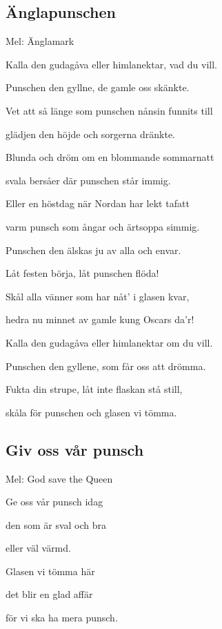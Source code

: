 

\pagestyle{Punschvisor}



\subsection{\textbf{Änglapunschen}}

Mel: Änglamark\bigskip


Kalla den gudagåva eller himlanektar, vad du vill.

Punschen den gyllne, de gamle oss skänkte.

Vet att så länge som punschen nånsin funnits till

glädjen den höjde och sorgerna dränkte.

Blunda och dröm om en blommande sommarnatt

svala bersåer där punschen står immig.

Eller en höstdag när Nordan har lekt tafatt

varm punsch som ångar och ärtsoppa simmig.\bigskip

Punschen den älskas ju av alla och envar.

Låt festen börja, låt punschen flöda!

Skål alla vänner som har nåt' i glasen kvar,

hedra nu minnet av gamle kung Oscars da'r!

Kalla den gudagåva eller himlanektar om du vill.

Punschen den gyllene, som får oss att drömma.

Fukta din strupe, låt inte flaskan stå still,

skåla för punschen och glasen vi tömma.

\subsection{\textbf{Giv oss vår punsch}}

Mel: God save the Queen\bigskip

Ge oss vår punsch idag

den som är sval och bra

eller väl värmd.

Glasen vi tömma här

det blir en glad affär

för vi ska ha mera punsch.

